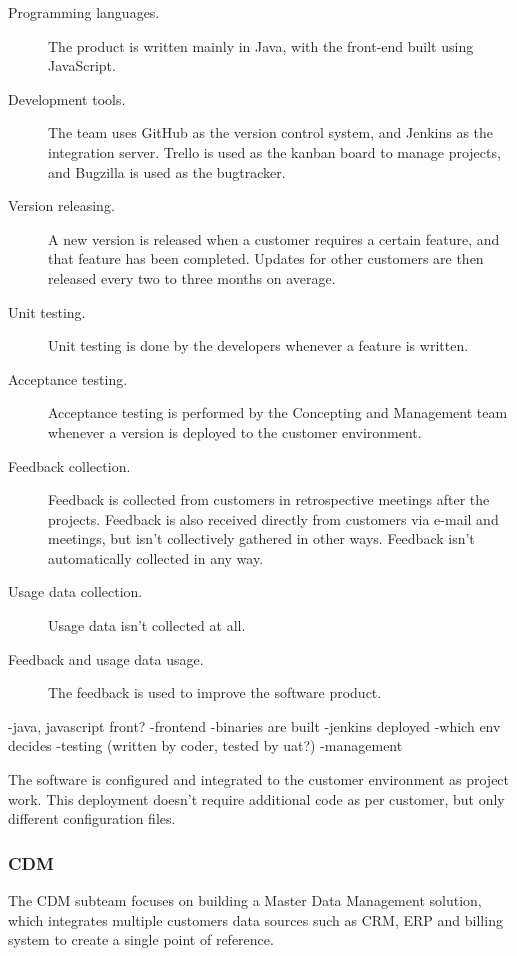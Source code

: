 \documentclass[english]{tktltiki2}
\theoremstyle{definition}
\theoremstyle{remark}
\begin{document}
\begin{description}
  \item[Programming languages.] The product is written mainly in Java, with the front-end built using JavaScript. 
  \item[Development tools.] The team uses GitHub as the version control system, and Jenkins as the integration server. Trello is used as the kanban board to manage projects, and Bugzilla is used as the bugtracker. 
  \item[Version releasing.] A new version is released when a customer requires a certain feature, and that feature has been completed. Updates for other customers are then released every two to three months on average.
  \item[Unit testing.] Unit testing is done by the developers whenever a feature is written. 
  \item[Acceptance testing.] Acceptance testing is performed by the Concepting and Management team whenever a version is deployed to the customer environment. 
  \item[Feedback collection.] Feedback is collected from customers in retrospective meetings after the projects. Feedback is also received directly from customers via e-mail and meetings, but isn't collectively gathered in other ways. Feedback isn't automatically collected in any way.
  \item[Usage data collection.] Usage data isn't collected at all.
  \item[Feedback and usage data usage.] The feedback is used to improve the software product. 
\end{description}

-java, javascript front?
-frontend
-binaries are built
-jenkins deployed
-which env decides
-testing (written by coder, tested by uat?)
-management

The software is configured and integrated to the customer environment as project work. This deployment doesn't require additional code as per customer, but only different configuration files. 

\subsubsection{CDM} 
The CDM subteam focuses on building a Master Data Management \cite{loshin2010master} solution, which integrates multiple customers data sources such as CRM, ERP and billing system to create a single point of reference. 
\end{document}
